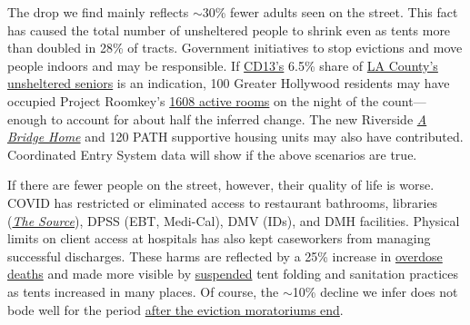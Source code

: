 \documentclass[11pt]{article}
\begin{document}
 The drop we find mainly reflects $\sim$30\% fewer adults seen on the 
street. This fact has caused the total number of unsheltered people to shrink even as tents more than
doubled in 28\% of tracts. Government initiatives to stop evictions and move people indoors and may be 
responsible. If \href{https://www.lahsa.org/documents?id=4672-2020-homeless-count-council-district-13}{CD13's} 6.5\% share of \href{https://www.lahsa.org/documents?id=4585-2020-greater-los-angeles-homeless-count-los-angeles-continuum-of-care-coc-}{LA County's unsheltered seniors} is an indication, 100 
Greater Hollywood residents may have occupied Project Roomkey's 
\href{https://projectroomkeytracker.com/}{1608 active rooms} on the night of the count---enough to
account for about half the inferred change. The new Riverside \href{https://www.lamayor.org/ABridgeHome}
{\it A Bridge Home} and 120 PATH supportive housing units may also have contributed.
Coordinated Entry System data will show if the above scenarios are true.

If there are fewer people on the street, however, their quality of life is worse. 
COVID has restricted or eliminated access to restaurant bathrooms, libraries 
(\href{https://www.lapl.org/homeless-resources/the-source}{\it The Source}), DPSS 
(EBT, Medi-Cal), DMV (IDs), and DMH facilities. Physical limits on client access at 
hospitals has also kept caseworkers from managing successful discharges. These harms 
are reflected by a 25\% increase in 
\href{https://www.latimes.com/california/story/2021-01-07/the-powerful-synthetic-opioid-fentanyl-is-behind-rising-deaths-in-the-homeless-population}{overdose deaths} and made more visible by \href{https://clkrep.lacity.org/onlinedocs/2020/20-0147_misc_3-17-20_p.pdf}{suspended}
tent folding and sanitation practices as tents increased in many places. 
Of course, the $\sim$10\% decline we infer does not bode well for the period \href{https://www.latimes.com/california/story/2021-01-12/new-report-foresees-tens-of-thousands-losing-homes-by-2023}
{after the eviction moratoriums end}.
\end{document}
